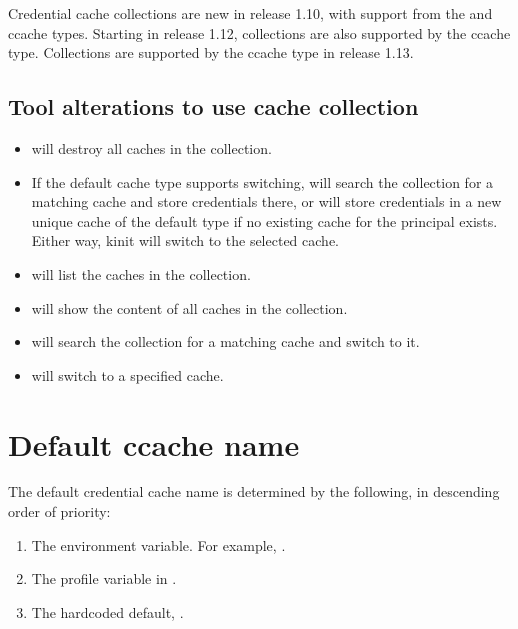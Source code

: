 \documentclass[letterpaper,10pt,english]{sphinxmanual}
\begin{document}
Credential cache collections are new in release 1.10, with support
from the  and  ccache types.  Starting in release 1.12,
collections are also supported by the  ccache type.
Collections are supported by the  ccache type in release 1.13.


\subsection{Tool alterations to use cache collection}
\label{\detokenize{basic/ccache_def:tool-alterations-to-use-cache-collection}}\begin{itemize}
\item {} 
  will destroy all caches in the collection.

\item {} 
If the default cache type supports switching, 
 will search the collection for a matching cache and
store credentials there, or will store credentials in a new unique
cache of the default type if no existing cache for the principal
exists.  Either way, kinit will switch to the selected cache.

\item {} 
  will list the caches in the collection.

\item {} 
  will show the content of all caches in the
collection.

\item {} 
  will search the collection for a
matching cache and switch to it.

\item {} 
  will switch to a specified cache.

\end{itemize}


\section{Default ccache name}
\label{\detokenize{basic/ccache_def:default-ccache-name}}
The default credential cache name is determined by the following, in
descending order of priority:
\begin{enumerate}
\item {} 
The  environment variable.  For example,
.

\item {} 
The  profile variable in .

\item {} 
The hardcoded default, .

\end{enumerate}
\end{document}

